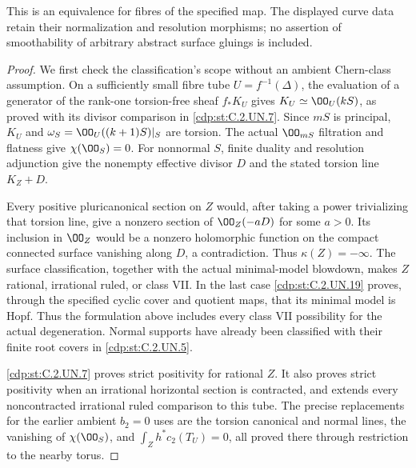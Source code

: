 \begin{proposition}
This is an equivalence for fibres of the specified map.
The displayed curve data retain their normalization and
resolution morphisms; no assertion of smoothability of
arbitrary abstract surface gluings is included.
\end{proposition}
\begin{proof}
We first check the classification's scope without an ambient
Chern-class assumption. On a sufficiently small fibre tube
$U=f^{-1}(\Delta)$, the evaluation of a generator of the
rank-one torsion-free sheaf $f_*K_U$ gives
$K_U\simeq\OO_U(kS)$, as proved with its divisor comparison
in \ref{cdp:st:C.2.UN.7}. Since $mS$ is principal, $K_U$ and
$\omega_S=\OO_U((k+1)S)|_S$ are torsion. The actual
$\OO_{mS}$ filtration and flatness give
$\chi(\OO_S)=0$. For nonnormal $S$, finite duality and
resolution adjunction give the nonempty effective divisor
$D$ and the stated torsion line $K_Z+D$.

Every positive pluricanonical section on $Z$ would, after
taking a power trivializing that torsion line, give a
nonzero section of $\OO_Z(-aD)$ for some $a>0$.
Its inclusion in $\OO_Z$ would be a nonzero holomorphic
function on the compact connected surface vanishing along
$D$, a contradiction. Thus $\kappa(Z)=-\infty$.
The surface classification, together with the actual
minimal-model blowdown, makes $Z$ rational, irrational
ruled, or class VII. In the last case \ref{cdp:st:C.2.UN.19} proves,
through the specified cyclic cover and quotient maps,
that its minimal model is Hopf. Thus the formulation
above includes every class VII possibility for the
actual degeneration. Normal supports have already been
classified with their finite root covers in \ref{cdp:st:C.2.UN.5}.

\ref{cdp:st:C.2.UN.7} proves strict positivity for rational $Z$.
It also proves strict positivity when an irrational
horizontal section is contracted, and extends every
noncontracted irrational ruled comparison to this tube.
The precise replacements for the earlier ambient $b_2=0$
uses are the torsion canonical and normal lines, the
vanishing of $\chi(\OO_S)$, and
$\int_Zh^*c_2(T_U)=0$, all proved there through restriction
to the nearby torus.


\end{proof}
